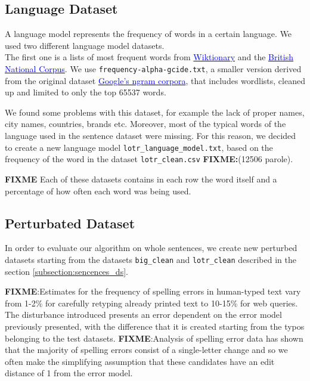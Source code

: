 \subsection{Language Dataset}
A language model represents the frequency of words in a certain language.
We used two different language model datasets. \\
The first one is a lists of most frequent words from 
\href{https://en.wiktionary.org/wiki/Wiktionary:Frequency_lists}{ 
	\textcolor{blue}{Wiktionary}} and the 
	\href{http://www.kilgarriff.co.uk/bnc-readme.html}{\textcolor{blue}{British National Corpus}}. 
We use \texttt{frequency-alpha-gcide.txt}, a smaller version derived from the original dataset 
\href{https://books.google.com/ngrams/}{\textcolor{blue}{Google's ngram corpora}}, that includes wordlists, 
cleaned up and limited to only the top \num{65537} words.

We found some problems with this dataset, for example the lack of proper names, city names, countries, brands 
etc.
Moreover, most of the typical words of the language used in the sentence dataset were missing.
For this reason, we decided to create a new language model \texttt{lotr\_language\_model.txt}, based on the 
frequency of the word in the dataset \texttt{lotr\_clean.csv} \textbf{FIXME:}(12506 parole).

\textbf{FIXME}{
	Each of these datasets contains in each row the word itself and a percentage of how often each word was 
	being used.}

\subsection{Perturbated Dataset}
\label{subsection:perturbed}
In order to evaluate our algorithm on whole sentences, we create new perturbed datasets starting from the 
datasets \texttt{big\_clean} and \texttt{lotr\_clean} described in the section \ref{subsection:sencences_ds}.

\textbf{FIXME}:Estimates for the frequency of spelling errors in human-typed text vary from 1-2\% for carefully 
retyping already printed text to 10-15\% for web queries.
The disturbance introduced presents an error dependent on the error model previously presented, with the 
difference that it is created starting from the typos belonging to the test datasets.
\textbf{FIXME}:{Analysis of spelling error data has shown that the majority of spelling errors consist of a 
single-letter change and so we often make the simplifying assumption that these candidates have an edit 
distance of 1 from the error model.}

